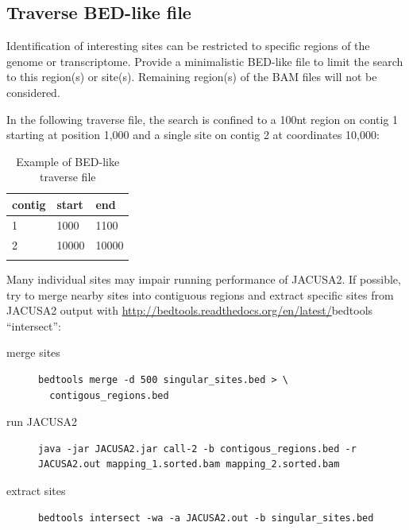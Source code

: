 \documentclass[10pt,a4paper]{article}
\begin{document}
\subsection{Traverse BED-like file}
Identification of interesting sites can be restricted to specific regions of the genome or transcriptome. 
Provide a minimalistic BED-like file to limit the search to this region(s) or site(s). 
Remaining region(s) of the BAM files will not be considered.

In the following traverse file, the search is confined to a 100nt region on contig 1
starting at position 1,000 and a single site on contig 2 at coordinates 10,000:
\begin{table}
\centering
\caption{Example of BED-like traverse file}
\label{tb:traverse_file}
\begin{tabular}{lll}
\textbf{contig} & \textbf{start} & \textbf{end} \\
\hline
1 & 1000 & 1100 \\
2 & 10000 & 10000 \\
\multicolumn{3}{c}{}
\end{tabular}
\end{table}
Many individual sites may impair running performance of JACUSA2.
If possible, try to merge nearby sites into contiguous regions and extract specific sites from 
JACUSA2 output with \url{http://bedtools.readthedocs.org/en/latest/}{bedtools} ``intersect'':
\begin{description}
\item[merge sites] \begin{verbatim} 
bedtools merge -d 500 singular_sites.bed > \ 
  contigous_regions.bed
\end{verbatim}
\item[run JACUSA2] \begin{verbatim} 
java -jar JACUSA2.jar call-2 -b contigous_regions.bed -r
JACUSA2.out mapping_1.sorted.bam mapping_2.sorted.bam
\end{verbatim}
\item[extract sites] \begin{verbatim}
bedtools intersect -wa -a JACUSA2.out -b singular_sites.bed
\end{verbatim}
\end{description}
\end{document}
